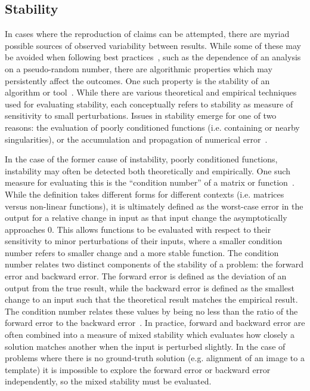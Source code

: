 \subsection{Stability}
In cases where the reproduction of claims can be attempted, there are myriad possible sources of observed variability
between results. While some of these may be avoided when following best practices~\cite{prlic2012ten},
such as the dependence of an analysis on a pseudo-random number, there are algorithmic properties which may
persistently affect the outcomes. One such property is the stability of an algorithm or tool~\cite{higham2002accuracy}.
While there are various theoretical and empirical techniques used for evaluating stability, each conceptually refers to
stability as measure of sensitivity to small perturbations. Issues in stability emerge for one of two reasons: the
evaluation of poorly conditioned functions (i.e. containing or nearby singularities), or the accumulation and
propagation of numerical error~\cite{higham2002accuracy}.

In the case of the former cause of instability, poorly conditioned functions, instability may often be detected both
theoretically and empirically. One such measure for evaluating this is the ``condition number'' of a matrix or
function~\cite{belsley2005regression}. While the definition takes different forms for different contexts (i.e. matrices
versus non-linear functions), it is ultimately defined as the worst-case error in the output for a relative change in
input as that input change the asymptotically approaches $0$. This allows functions to be evaluated with respect to
their sensitivity to minor perturbations of their inputs, where a smaller condition number refers to smaller change and
a more stable function. The condition number relates two distinct components of the stability of a problem: the forward
error and backward error. The forward error is defined as the deviation of an output from the true result, while the
backward error is defined as the smallest change to an input such that the theoretical result matches the empirical
result. The condition number relates these values by being no less than the ratio of the forward error to the backward
error~\cite{belsley2005regression}. In practice, forward and backward error are often combined into a measure of mixed
stability which evaluates how closely a solution matches another when the input is perturbed slightly. In the case of
problems where there is no ground-truth solution (e.g. alignment of an image to a template) it is impossible to explore
the forward error or backward error independently, so the mixed stability must be evaluated.

